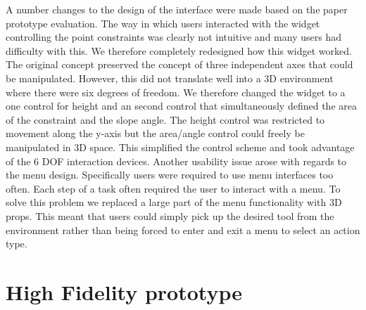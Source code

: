 \documentclass{article}
\begin{document}
A number changes to the design of the interface were made based on the paper prototype evaluation.
\newline\newline
The way in which users interacted with the widget controlling the point constraints was clearly not intuitive and many users had difficulty with this. We therefore completely redesigned how this widget worked. The original concept preserved the concept of three independent axes that could be manipulated. However, this did not translate well into a 3D environment where there were six degrees of freedom. We therefore changed the widget to a one control for height and an second control that simultaneously defined the area of the constraint and the slope angle. The height control was restricted to movement along the y-axis but the area/angle control could freely be manipulated in 3D space. This simplified the control scheme and took advantage of the 6 DOF interaction devices.
\newline\newline
Another usability issue arose with regards to the menu design. Specifically users were required to use menu interfaces too often. Each step of a task often required the user to interact with a menu. To solve this problem we replaced a large part of the menu functionality with 3D props. This meant that users could simply pick up the desired tool from the environment rather than being forced to enter and exit a menu to select an action type.

\section{High Fidelity prototype}
\end{document}
